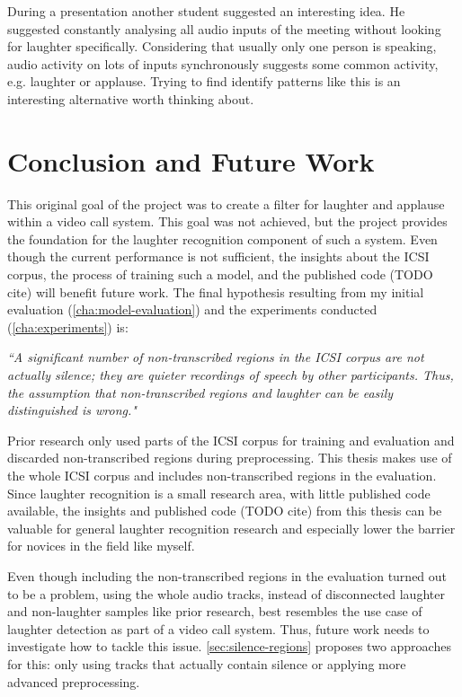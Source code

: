 \documentclass[bsc,frontabs,parskip,deptreport]{infthesis}
\begin{document}
During a presentation another student suggested an interesting idea. He suggested constantly analysing all audio inputs of the meeting without looking for laughter specifically. Considering that usually only one person is speaking, audio activity on lots of inputs synchronously suggests some common activity, e.g. laughter or applause. Trying to find identify patterns like this is an interesting alternative worth thinking about. 

\chapter{Conclusion and Future Work}
This original goal of the project was to create a filter for laughter and applause within a video call system. This goal was not achieved, but the project provides the foundation for the laughter recognition component of such a system.
Even though the current performance is not sufficient, the insights about the ICSI corpus, the process of training such a model, and the published code (TODO cite) will benefit future work.
The final hypothesis resulting from my initial evaluation (\autoref{cha:model-evaluation}) and the experiments conducted (\autoref{cha:experiments}) is:

\textit{``A significant number of non-transcribed regions in the ICSI corpus are not actually silence; they are quieter recordings of speech by other participants. Thus, the assumption that non-transcribed regions and laughter can be easily distinguished is wrong."}

Prior research \citep{kennedy2004laughter,knox2006automatic, truong2005automatic} only used parts of the ICSI corpus for training and evaluation and discarded non-transcribed regions during preprocessing.
This thesis makes use of the whole ICSI corpus and includes non-transcribed regions in the evaluation. 
Since laughter recognition is a small research area, with little published code available, the insights and published code (TODO cite) from this thesis can be valuable for general laughter recognition research and especially lower the barrier for novices in the field like myself.

Even though including the non-transcribed regions in the evaluation turned out to be a problem, using the whole audio tracks, instead of disconnected laughter and non-laughter samples like prior research, best resembles the use case of laughter detection as part of a video call system. 
Thus, future work needs to investigate how to tackle this issue.
\autoref{sec:silence-regions} proposes two approaches for this: only using tracks that actually contain silence or applying more advanced preprocessing. 
\end{document}
